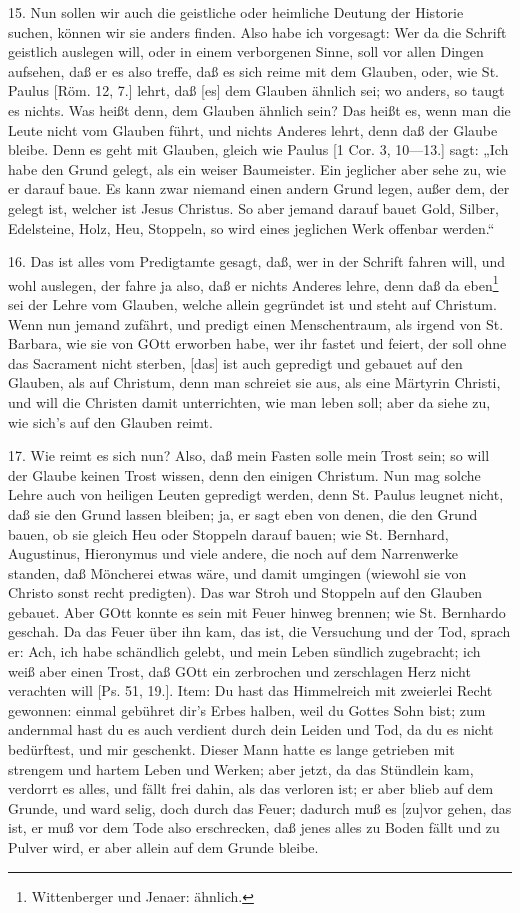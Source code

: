 15. Nun sollen wir auch die geistliche oder heimliche Deutung der Historie suchen, können wir sie anders finden. Also habe ich vorgesagt: Wer da die Schrift geistlich auslegen will, oder in einem verborgenen Sinne, soll vor allen Dingen aufsehen, daß er es also treffe, daß es sich reime mit dem Glauben, oder, wie St. Paulus [Röm. 12, 7.] lehrt, daß [es] dem Glauben ähnlich sei; wo anders, so taugt es nichts. Was heißt denn, dem Glauben ähnlich sein? Das heißt es, wenn man die Leute nicht vom Glauben führt, und nichts Anderes lehrt, denn daß der Glaube bleibe. Denn es geht mit Glauben, gleich wie Paulus [1 Cor. 3, 10—13.] sagt: „Ich habe den Grund gelegt, als ein weiser Baumeister. Ein jeglicher aber sehe zu, wie er darauf baue. Es kann zwar niemand einen andern Grund legen, außer dem, der gelegt ist, welcher ist Jesus Christus. So aber jemand darauf bauet Gold, Silber, Edelsteine, Holz, Heu, Stoppeln, so wird eines jeglichen Werk offenbar werden.“

16. Das ist alles vom Predigtamte gesagt, daß, wer in der Schrift fahren will, und wohl auslegen, der fahre ja also, daß er nichts Anderes lehre, denn daß da eben\footnote{Wittenberger und Jenaer: ähnlich.} sei der Lehre vom Glauben, welche allein gegründet ist und steht auf Christum. Wenn nun jemand zufährt, und predigt einen Menschentraum, als irgend von St. Barbara, wie sie von GOtt erworben habe, wer ihr fastet und feiert, der soll ohne das Sacrament nicht sterben, [das] ist auch gepredigt und gebauet auf den Glauben, als auf Christum, denn man schreiet sie aus, als eine Märtyrin Christi, und will die Christen damit unterrichten, wie man leben soll; aber da siehe zu, wie sich’s auf den Glauben reimt.

17. Wie reimt es sich nun? Also, daß mein Fasten solle mein Trost sein; so will der Glaube keinen Trost wissen, denn den einigen Christum. Nun mag solche Lehre auch von heiligen Leuten gepredigt werden, denn St. Paulus leugnet nicht, daß sie den Grund lassen bleiben; ja, er sagt eben von denen, die den Grund bauen, ob sie gleich Heu oder Stoppeln darauf bauen; wie St. Bernhard, Augustinus, Hieronymus und viele andere, die noch auf dem Narrenwerke standen, daß Möncherei etwas wäre, und damit umgingen (wiewohl sie von Christo sonst recht predigten). Das war Stroh und Stoppeln auf den Glauben gebauet. Aber GOtt konnte es sein mit Feuer hinweg brennen; wie St. Bernhardo geschah. Da das Feuer über ihn kam, das ist, die Versuchung und der Tod, sprach er: Ach, ich habe schändlich gelebt, und mein Leben sündlich zugebracht; ich weiß aber einen Trost, daß GOtt ein zerbrochen und zerschlagen Herz
nicht verachten will [Ps. 51, 19.]. Item: Du hast das Himmelreich mit zweierlei Recht gewonnen: einmal gebühret dir’s Erbes halben, weil du Gottes Sohn bist; zum andernmal hast du es auch verdient durch dein Leiden und Tod, da du es nicht bedürftest, und mir geschenkt. Dieser Mann hatte es lange getrieben mit strengem und hartem Leben und Werken; aber jetzt, da das Stündlein kam, verdorrt es alles, und fällt frei dahin, als das verloren ist; er aber blieb auf dem Grunde, und ward selig, doch durch das Feuer; dadurch muß es [zu]vor gehen, das ist, er muß vor dem Tode also erschrecken, daß jenes alles zu Boden fällt und zu Pulver wird, er aber allein auf dem Grunde bleibe.

